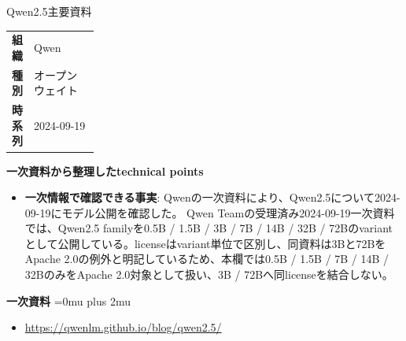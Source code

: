 \begin{technicalnote}{Qwen2.5}{主要資料}
\begingroup
\begin{tabularx}{\linewidth}{@{}>{\bfseries}p{0.22\linewidth}X@{}}
組織 & Qwen \\
種別 & オープンウェイト \\
時系列 & 2024-09-19 \\
\end{tabularx}
\smallskip
{\bfseries 一次資料から整理したtechnical points}
\begin{itemize}[leftmargin=1.5em,itemsep=0.35em]
\item \textbf{一次情報で確認できる事実}: Qwenの一次資料により、Qwen2.5について2024-09-19にモデル公開を確認した。 Qwen Teamの受理済み2024-09-19一次資料では、Qwen2.5 familyを0.5B / 1.5B / 3B / 7B / 14B / 32B / 72Bのvariantとして公開している。licenseはvariant単位で区別し、同資料は3Bと72BをApache 2.0の例外と明記しているため、本欄では0.5B / 1.5B / 7B / 14B / 32BのみをApache 2.0対象として扱い、3B / 72Bへ同licenseを結合しない。
\end{itemize}
\begin{minipage}{\linewidth}
\begin{samepage}
{\bfseries 一次資料}
\begingroup\sloppy
\Urlmuskip=0mu plus 2mu\relax
\begin{itemize}[leftmargin=1.5em,itemsep=0.25em]
\item {\scriptsize\url{https://qwenlm.github.io/blog/qwen2.5/}}
\end{itemize}
\endgroup
\end{samepage}
\end{minipage}
\endgroup
\end{technicalnote}
\medskip

